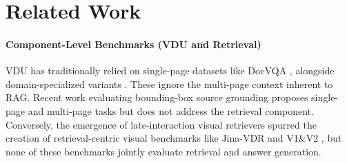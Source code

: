 \section{Related Work}

\paragraph{Component-Level Benchmarks (VDU and Retrieval)} VDU has traditionally relied on single-page datasets like DocVQA , alongside domain-specialized variants . These ignore the multi-page context inherent to RAG. Recent work evaluating bounding-box source grounding  proposes single-page and multi-page tasks but does not address the retrieval component. Conversely, the emergence of late-interaction visual retrievers  spurred the creation of retrieval-centric visual benchmarks like Jina-VDR   and \vidore \space V1\&V2  , but none of these benchmarks jointly evaluate retrieval and answer generation.

